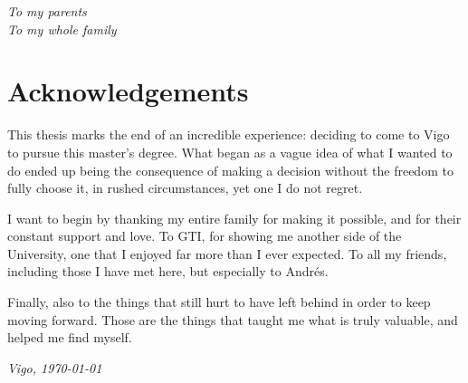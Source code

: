 
\newpage
\thispagestyle{empty}
\mbox{}
\addtocounter{page}{-1}


\newpage
\thispagestyle{empty}

\begin{flushright}
  \emph{To my parents} \\
  \emph{To my whole family} \\
\end{flushright}

\clearemptydoublepage


\thispagestyle{empty}

\section*{Acknowledgements}

This thesis marks the end of an incredible experience: deciding to come to Vigo to pursue this master’s degree.
What began as a vague idea of what I wanted to do ended up being the consequence of making a decision without the freedom to fully choose it, in rushed circumstances, yet one I do not regret.

I want to begin by thanking my entire family for making it possible, and for their constant support and love.
To GTI, for showing me another side of the University, one that I enjoyed far more than I ever expected.
To all my friends, including those I have met here, but especially to Andrés.


Finally, also to the things that still hurt to have left behind in order to keep moving forward.
Those are the things that taught me what is truly valuable, and helped me find myself.

\begin{flushright}
  \textit{Vigo, \today}
\end{flushright}

\clearemptydoublepage
